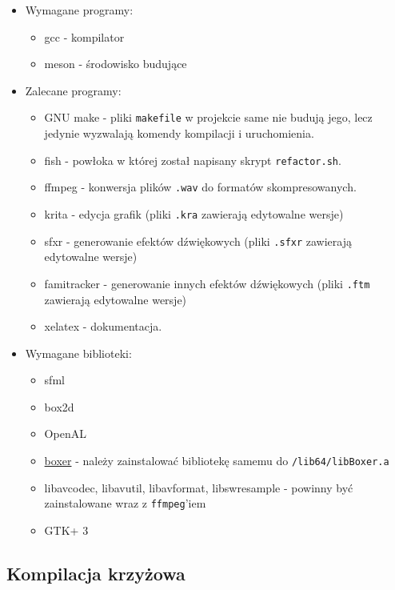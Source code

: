 \documentclass[a4paper,11pt]{article}
\begin{document}
\begin{itemize}
    \item Wymagane programy:
    \begin{itemize}
        \item gcc - kompilator
        \item meson - środowisko budujące
    \end{itemize}
    \item Zalecane programy:
    \begin{itemize}
        \item GNU make - pliki \texttt{makefile} w projekcie same nie budują jego, lecz jedynie wyzwalają komendy kompilacji i uruchomienia.
        \item fish - powłoka w której został napisany skrypt \texttt{refactor.sh}.
        \item ffmpeg - konwersja plików \texttt{.wav} do formatów skompresowanych.
        \item krita - edycja grafik (pliki \texttt{.kra} zawierają edytowalne wersje)
        \item sfxr - generowanie efektów dźwiękowych (pliki \texttt{.sfxr} zawierają edytowalne wersje)
        \item famitracker - generowanie innych efektów dźwiękowych (pliki \texttt{.ftm} zawierają edytowalne wersje)
        \item xelatex - dokumentacja.
    \end{itemize}
    \item Wymagane biblioteki:
    \begin{itemize}
        \item sfml
        \item box2d
        \item OpenAL
        \item \href{https://github.com/aaronmjacobs/Boxer}{boxer} - należy zainstalować bibliotekę samemu do \texttt{/lib64/libBoxer.a}
        \item libavcodec, libavutil, libavformat, libswresample - powinny być zainstalowane wraz z \texttt{ffmpeg}'iem
        \item GTK+ 3
    \end{itemize}
\end{itemize}

\subsection*{Kompilacja krzyżowa}
\end{document}
